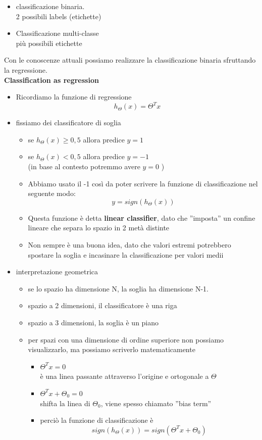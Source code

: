 \documentclass[10pt,oneside,a4paper]{article}
\begin{document}
\begin{itemize}
\item classificazione binaria.\\
2 possibili labels (etichette)
\item Classificazione multi-classe \\
più possibili etichette
\end{itemize}
Con le conoscenze attuali possiamo realizzare la classificazione binaria sfruttando la regressione. \\
\textbf{Classification as regression}
\begin{itemize}
\item Ricordiamo la funzione di regressione 
$$h_{\Theta}(x)=\Theta^{T}x$$
\item fissiamo dei classificatore di soglia

\begin{itemize}
\item se $h_{\Theta}(x) \ge 0,5$ allora predice $y=1$
\item se $h_{\Theta}(x) < 0,5$ allora predice $y=-1$\\
(in base al contesto potremmo avere $y=0$ )
\item Abbiamo usato il -1 così da poter scrivere la funzione di classificazione nel seguente modo:
$$y=sign(h_{\Theta}(x))$$
\item Questa funzione è detta \textbf{linear classifier}, dato che ''imposta'' un confine lineare che separa lo spazio in 2 metà distinte

\item Non sempre è una buona idea, dato che valori estremi potrebbero spostare la soglia e incasinare la classificazione per valori medii
\end{itemize}
\item interpretazione geometrica
\begin{itemize}
\item se lo spazio ha dimensione N, la soglia ha dimensione N-1.
\item spazio a 2 dimensioni, il classificatore è una riga
\item  spazio a 3 dimensioni, la soglia è un piano
\item per spazi con una dimensione di ordine superiore non possiamo visualizzarlo, ma possiamo scriverlo matematicamente

\begin{itemize}
\item $\Theta^{T}x=0$ \\
 è una linea passante attraverso l'origine e ortogonale a $\Theta $
 
 \item  $\Theta^{T}x+\Theta_{0}=0$ \\ shifta la linea di $\Theta_{0}$, viene spesso chiamato ''bias term''
 
 \item perciò la funzione di classificazione è 
 $$sign(h_{\Theta}(x))=sign(\Theta^{T}x+\Theta_{0})$$
\end{itemize}

\end{itemize}

\end{itemize}
\end{document}
